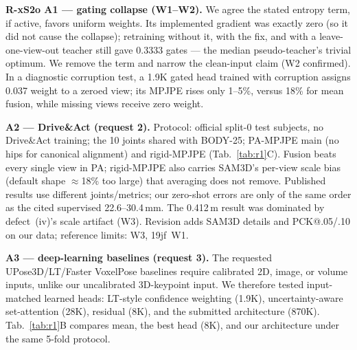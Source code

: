 \documentclass[10pt,twocolumn,letterpaper]{article}
\newcommand{\rpoint}[1]{\noindent\textbf{#1}\;}
\begin{document}
\rpoint{R-xS2o A1 --- gating collapse (W1--W2).}
We agree the stated entropy term, if active, favors uniform weights. Its implemented gradient was exactly zero (so it did not cause the collapse); retraining without it, with the fix, and with a leave-one-view-out teacher still gave 0.3333 gates --- the median pseudo-teacher's trivial optimum. We remove the term and narrow the clean-input claim (W2 confirmed). In a diagnostic corruption test, a 1.9K gated head trained with corruption assigns 0.037 weight to a zeroed view; its MPJPE rises only 1--5\%, versus 18\% for mean fusion, while missing views receive zero weight.

\rpoint{A2 --- Drive\&Act (request 2).}
Protocol: official split-0 test subjects, no Drive\&Act training; the 10 joints shared with BODY-25; PA-MPJPE main (no hips for canonical alignment) and rigid-MPJPE (Tab.~\ref{tab:r1}C). Fusion beats every single view in PA; rigid-MPJPE also carries SAM3D's per-view scale bias (default shape $\approx$18\% too large) that averaging does not remove. Published results use different joints/metrics; our zero-shot errors are only of the same order as the cited supervised 22.6--30.4\,mm. The 0.412\,m result was dominated by defect~(iv)'s scale artifact (W3). Revision adds SAM3D details and PCK@.05/.10 on our data; reference limits: W3, 19jf~W1.

\rpoint{A3 --- deep-learning baselines (request 3).}
The requested UPose3D/LT/Faster VoxelPose baselines require calibrated 2D, image, or volume inputs, unlike our uncalibrated 3D-keypoint input. We therefore tested input-matched learned heads: LT-style confidence weighting (1.9K), uncertainty-aware set-attention (28K), residual (8K), and the submitted architecture (870K). Tab.~\ref{tab:r1}B compares mean, the best head (8K), and our architecture under the same 5-fold protocol.
\end{document}
